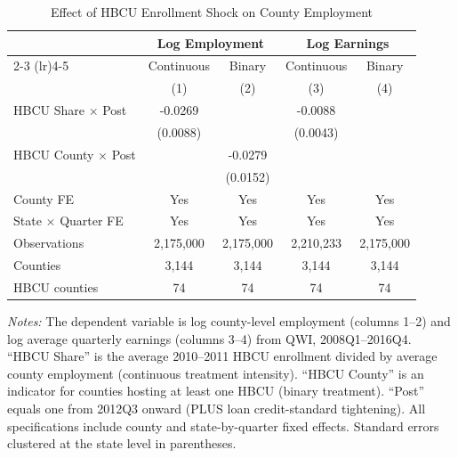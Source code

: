 
\begin{table}[t]
\centering
\caption{Effect of HBCU Enrollment Shock on County Employment}
\label{tab:main}
\begin{threeparttable}
\begin{tabular}{lcccc}
\hline\hline
 & \multicolumn{2}{c}{Log Employment} & \multicolumn{2}{c}{Log Earnings} \\
 \cmidrule(lr){2-3} \cmidrule(lr){4-5}
 & Continuous & Binary & Continuous & Binary \\
 & (1) & (2) & (3) & (4) \\
\hline
\addlinespace
HBCU Share $\times$ Post & -0.0269 & & -0.0088 & \\
 & (0.0088) & & (0.0043) & \\
HBCU County $\times$ Post & & -0.0279 & & \\
 & & (0.0152) & & \\
\addlinespace
\hline
County FE & Yes & Yes & Yes & Yes \\
State $\times$ Quarter FE & Yes & Yes & Yes & Yes \\
Observations & 2,175,000 & 2,175,000 & 2,210,233 & 2,175,000 \\
Counties & 3,144 & 3,144 & 3,144 & 3,144 \\
HBCU counties & 74 & 74 & 74 & 74 \\
\hline\hline
\end{tabular}
\begin{tablenotes}\small
\item \textit{Notes:} The dependent variable is log county-level employment (columns 1--2) and log average quarterly earnings (columns 3--4) from QWI, 2008Q1--2016Q4. ``HBCU Share'' is the average 2010--2011 HBCU enrollment divided by average county employment (continuous treatment intensity). ``HBCU County'' is an indicator for counties hosting at least one HBCU (binary treatment). ``Post'' equals one from 2012Q3 onward (PLUS loan credit-standard tightening). All specifications include county and state-by-quarter fixed effects. Standard errors clustered at the state level in parentheses.
\end{tablenotes}
\end{threeparttable}
\end{table}
